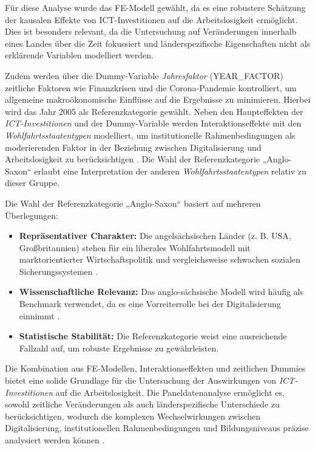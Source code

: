 Für diese Analyse wurde das \ac{FE}-Modell gewählt, da es eine robustere Schätzung 
der kausalen Effekte von ICT-Investitionen auf die Arbeitslosigkeit ermöglicht. Dies ist 
besonders relevant, da die Untersuchung auf Veränderungen innerhalb eines Landes über die Zeit 
fokussiert und länderspezifische Eigenschaften nicht als erklärende Variablen modelliert werden.

Zudem werden über die Dummy-Variable \textit{Jahresfaktor} (YEAR\_FACTOR) zeitliche 
Faktoren wie Finanzkrisen und die Corona-Pandemie kontrolliert, um allgemeine makroökonomische 
Einflüsse auf die Ergebnisse zu minimieren. Hierbei wird das Jahr 2005 als Referenzkategorie 
gewählt. Neben den Haupteffekten der \textit{\ac{ICT}-Investitionen} und der Dummy-Variable 
werden Interaktionseffekte mit den \textit{Wohlfahrtsstaatentypen} modelliert, um 
institutionelle Rahmenbedingungen als moderierenden Faktor in der Beziehung zwischen 
Digitalisierung und Arbeitslosigkeit zu berücksichtigen \parencite{espingandersen1990thethree}. 
Die Wahl der Referenzkategorie „Anglo-Saxon“ erlaubt eine Interpretation der anderen 
\textit{Wohlfahrtsstaatentypen} relativ zu dieser Gruppe. 

Die Wahl der Referenzkategorie „Anglo-Saxon“ basiert auf mehreren Überlegungen:

\begin{itemize}
    \item \textbf{Repräsentativer Charakter:} Die angelsächsischen Länder (z. B. USA, 
    Großbritannien) stehen für ein liberales Wohlfahrtsmodell mit 
    marktorientierter Wirtschaftspolitik und vergleichsweise schwachen sozialen 
    Sicherungssystemen \parencite[S. 15–50]{brynjolfsson2014thesecond}.

    \item \textbf{Wissenschaftliche Relevanz:} Das anglo-sächsische Modell wird häufig als 
    Benchmark verwendet, da es eine Vorreiterrolle bei der Digitalisierung einnimmt 
    \parencite[Kap. 2]{brynjolfsson2014thesecond}.

    \item \textbf{Statistische Stabilität:} Die Referenzkategorie weist eine ausreichende 
    Fallzahl auf, um robuste Ergebnisse zu gewährleisten.
\end{itemize}

Die Kombination aus \ac{FE}-Modellen, Interaktionseffekten und 
zeitlichen Dummies bietet eine solide Grundlage für die Untersuchung der 
Auswirkungen von \textit{\ac{ICT}-Investitionen} auf die Arbeitslosigkeit. Die 
Paneldatenanalyse ermöglicht es, sowohl zeitliche Veränderungen als auch 
länderspezifische Unterschiede zu berücksichtigen, wodurch die komplexen Wechselwirkungen 
zwischen Digitalisierung, institutionellen Rahmenbedingungen und Bildungsniveaus präzise 
analysiert werden können \parencite[S. 12–15]{baltagi2021econometric}.
